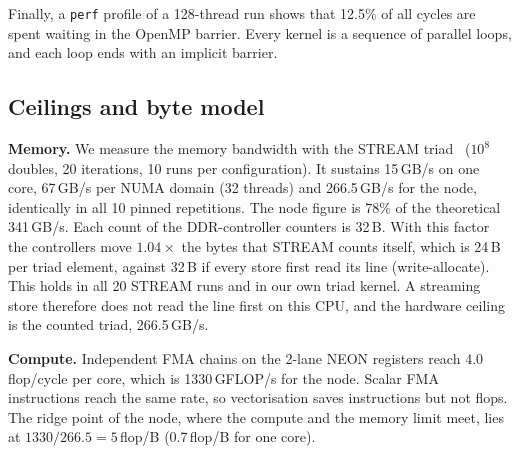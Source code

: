 \documentclass[a4paper,11pt]{article}
\newcommand{\kernel}[1]{\texttt{#1}}
\newcommand{\GBs}{\,GB/s}
\newcommand{\GFs}{\,GFLOP/s}
\begin{document}
Finally, a \texttt{perf} profile of a 128-thread run shows that 12.5\% of all cycles are spent waiting in the
OpenMP barrier. Every kernel is a sequence of parallel loops, and each loop ends with an implicit barrier.

\begin{table}[htbp]
  \centering\small
  
  \caption{Per-kernel time share (bm3840; ``128 cores'' = 1$\times$128), IPC, share of SIMD and scalar
    floating-point instructions and back-end stall cycles on 1 / 128 cores. Numbers refer to
    Figure~\ref{fig:roofline}. \kernel{reset\_field}, \kernel{revert} and \kernel{update\_halo} do no
    floating-point work. Not per kernel: a \texttt{perf} profile at 1$\times$128 puts 12.5\% of all cycles in the
    OpenMP barrier (\texttt{gomp\_team\_barrier\_wait\_end}).}
  \label{tab:kernels}
\end{table}

\subsection{Ceilings and byte model}
\label{sec:ceil}
\textbf{Memory.} We measure the memory bandwidth with the STREAM triad~\cite{mccalpin1995} ($10^8$ doubles, 20 iterations, 10 runs
per configuration). It sustains 15\GBs{} on one core, 67\GBs{} per NUMA domain (32 threads) and 266.5\GBs{}
for the node, identically in all 10 pinned repetitions. The node figure is 78\% of the theoretical 341\GBs{}.
Each count of the DDR-controller counters is 32\,B. With this factor the controllers move $1.04\times$ the
bytes that STREAM counts itself, which is 24\,B per triad element, against 32\,B if every store first read its
line (write-allocate). This holds in all 20 STREAM runs and in our own triad kernel. A streaming store
therefore does not read the line first on this CPU, and the hardware ceiling is the counted triad,
266.5\GBs{}.

\textbf{Compute.} Independent FMA chains on the 2-lane NEON registers reach 4.0\,flop/cycle per core, which is
1330\GFs{} for the node. Scalar FMA instructions reach the same rate, so vectorisation saves instructions but
not flops. The ridge point of the node, where the compute and the memory limit meet, lies at
$1330/266.5 = 5$\,flop/B (0.7\,flop/B for one core).
\end{document}
